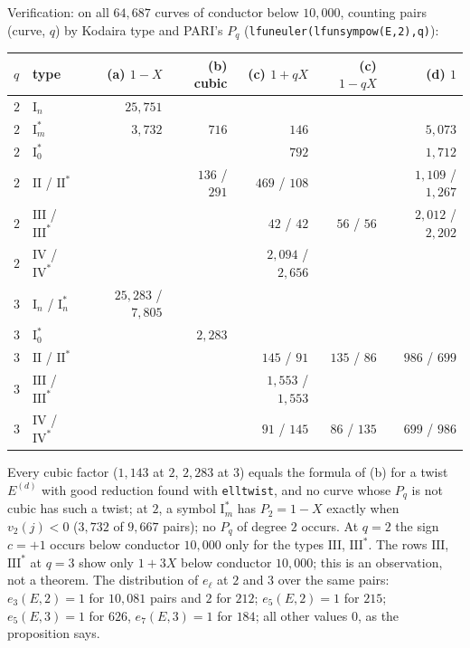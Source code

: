 Verification: on all $64{,}687$ curves of conductor below $10{,}000$, counting pairs (curve, $q$) by Kodaira type and PARI's $P_q$ (\texttt{lfuneuler(lfunsympow(E,2),q)}):
\begin{center}\footnotesize\setlength{\tabcolsep}{4pt}
\begin{tabular}{llrrrrr}
\toprule
$q$ & type & (a) $1-X$ & (b) cubic & (c) $1+qX$ & (c) $1-qX$ & (d) $1$\\
\midrule
$2$ & $\mathrm I_n$ & $25{,}751$ & & & & \\
$2$ & $\mathrm I_m^*$ & $3{,}732$ & $716$ & $146$ & & $5{,}073$\\
$2$ & $\mathrm I_0^*$ & & & $792$ & & $1{,}712$\\
$2$ & $\mathrm{II}$ / $\mathrm{II}^*$ & & $136$ / $291$ & $469$ / $108$ & & $1{,}109$ / $1{,}267$\\
$2$ & $\mathrm{III}$ / $\mathrm{III}^*$ & & & $42$ / $42$ & $56$ / $56$ & $2{,}012$ / $2{,}202$\\
$2$ & $\mathrm{IV}$ / $\mathrm{IV}^*$ & & & $2{,}094$ / $2{,}656$ & & \\
$3$ & $\mathrm I_n$ / $\mathrm I_n^*$ & $25{,}283$ / $7{,}805$ & & & & \\
$3$ & $\mathrm I_0^*$ & & $2{,}283$ & & & \\
$3$ & $\mathrm{II}$ / $\mathrm{II}^*$ & & & $145$ / $91$ & $135$ / $86$ & $986$ / $699$\\
$3$ & $\mathrm{III}$ / $\mathrm{III}^*$ & & & $1{,}553$ / $1{,}553$ & & \\
$3$ & $\mathrm{IV}$ / $\mathrm{IV}^*$ & & & $91$ / $145$ & $86$ / $135$ & $699$ / $986$\\
\bottomrule
\end{tabular}
\end{center}
Every cubic factor ($1{,}143$ at $2$, $2{,}283$ at $3$) equals the formula of (b) for a twist $E^{(d)}$ with good reduction found with \texttt{elltwist}, and no curve whose $P_q$ is not
cubic has such a twist; at $2$, a symbol $\mathrm I_m^*$ has $P_2=1-X$ exactly when $v_2(j)<0$ ($3{,}732$ of $9{,}667$ pairs); no $P_q$ of degree $2$ occurs. At $q=2$ the
sign $c=+1$ occurs below conductor $10{,}000$ only for the types $\mathrm{III}$, $\mathrm{III}^*$. The rows $\mathrm{III}$, $\mathrm{III}^*$ at $q=3$ show only $1+3X$ below
conductor $10{,}000$; this is an observation, not a theorem. The distribution of $e_\ell$ at $2$ and $3$ over the same pairs: $e_3(E,2)=1$ for $10{,}081$ pairs and $2$ for $212$;
$e_5(E,2)=1$ for $215$; $e_5(E,3)=1$ for $626$, $e_7(E,3)=1$ for $184$; all other values $0$, as the proposition says.

